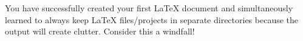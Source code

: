 You have successfully created your first \LaTeX{} document and
simultaneously learned to always keep \LaTeX{} files/projects in
separate directories because the output will create clutter. Consider
this a windfall!



% 



